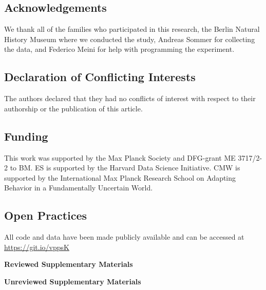 \documentclass[a4paper,man, floatsintext, natbib]{apa6}
\begin{document}
\subsection{Acknowledgements}
\noindent
We thank all of the families who participated in this research, the Berlin Natural History Museum where we conducted the study, Andreas Sommer for collecting the data, and Federico Meini for help with programming the experiment.

\subsection{Declaration of Conflicting Interests}
\noindent
The authors declared that they had no conflicts of interest with respect to their authorship or the publication of this article.

\subsection{Funding}
\noindent
This work was supported by the Max Planck Society and DFG-grant ME 3717/2-2 to BM. ES is supported by the Harvard Data Science Initiative. CMW is supported by the International Max Planck Research School on Adapting Behavior in a Fundamentally Uncertain World. 
 
\subsection{Open Practices}
\noindent
All code and data have been made publicly available and can be accessed at \url{https://git.io/vppsK}




\clearpage

\setcounter{equation}{0}
\setcounter{figure}{0}
\setcounter{table}{0}
\setcounter{page}{1}
\makeatletter
\renewcommand{\theequation}{S\arabic{equation}}
\renewcommand{\thefigure}{S\arabic{figure}}
\renewcommand{\thetable}{S\arabic{table}}
\renewcommand{\bibnumfmt}[1]{[S#1]}
\renewcommand{\citenumfont}[1]{S#1}

\begin{center}

\textbf{\large Reviewed Supplementary Materials} 
\end{center}

\clearpage
\setcounter{equation}{0}
\setcounter{page}{1}
\begin{center}
\textbf{\large Unreviewed Supplementary Materials}
\end{center}

\end{document}
